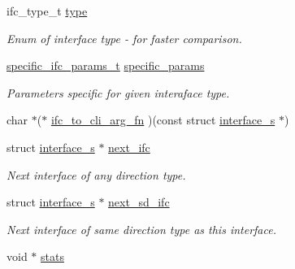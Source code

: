 \begin{DoxyCompactItemize}
\mbox{\label{structinterface__s_a77b6cef837fad621310f43da48baf19b}} 
ifc\+\_\+type\+\_\+t \hyperlink{structinterface__s_a77b6cef837fad621310f43da48baf19b}{type}
\begin{DoxyCompactList}\small\item\em Enum of interface type -\/ for faster comparison. \end{DoxyCompactList}\item 
\mbox{\label{structinterface__s_a25d3accd44d1c8c517925b7ac1e8869b}} 
\hyperlink{unionspecific__ifc__params__u}{specific\+\_\+ifc\+\_\+params\+\_\+t} \hyperlink{structinterface__s_a25d3accd44d1c8c517925b7ac1e8869b}{specific\+\_\+params}
\begin{DoxyCompactList}\small\item\em Parameters specific for given interaface type. \end{DoxyCompactList}\item 
char $\ast$($\ast$ \hyperlink{structinterface__s_a4f24efb8acb3f606561010905907f810}{ifc\+\_\+to\+\_\+cli\+\_\+arg\+\_\+fn} )(const struct \hyperlink{structinterface__s}{interface\+\_\+s} $\ast$)
\item 
\mbox{\label{structinterface__s_a97e2983f0a23f0fa13e066f1b5fa5b96}} 
struct \hyperlink{structinterface__s}{interface\+\_\+s} $\ast$ \hyperlink{structinterface__s_a97e2983f0a23f0fa13e066f1b5fa5b96}{next\+\_\+ifc}
\begin{DoxyCompactList}\small\item\em Next interface of any direction type. \end{DoxyCompactList}\item 
\mbox{\label{structinterface__s_a34a910166c744781d4218a8866d38c94}} 
struct \hyperlink{structinterface__s}{interface\+\_\+s} $\ast$ \hyperlink{structinterface__s_a34a910166c744781d4218a8866d38c94}{next\+\_\+sd\+\_\+ifc}
\begin{DoxyCompactList}\small\item\em Next interface of same direction type as this interface. \end{DoxyCompactList}\item 
void $\ast$ \hyperlink{structinterface__s_a9a2a9a22fe2818ec3cdd1a9f053c5dfc}{stats}
\end{DoxyCompactItemize}


